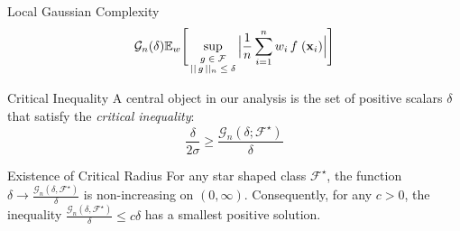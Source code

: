 \documentclass[11pt]{beamer}
\newcommand{\E}{\mathbb{E}}
\newcommand{\bx}{\mathbf{x}}
\newcommand{\cF}{\mathcal{F}}
\newcommand{\cG}{\mathcal{G}}
\begin{document}
	\begin{frame}				
		\begin{block}{Local Gaussian Complexity}
			\begin{equation*}
			\cG_n(\delta)  \E_w\Bigg[\sup_{
				\begin{scriptsize}
				\begin{matrix}
				g\in \cF\\||\,g\,||_n \leq \delta
				\end{matrix}
				\end{scriptsize}}\Big|\frac{1}{n}\sum_{i = 1}^{n}w_i\, f\;(\bx_i)\Big|\Bigg] 
			\end{equation*}
		\end{block}
		
		\begin{block}{Critical Inequality}
			A central object in our analysis is the set of positive scalars $\delta$ that satisfy the \textit{critical inequality}:
			\begin{equation*}
			\frac{\delta}{2\sigma} \geq \frac{\cG_n(\delta; \cF^\star)}{\delta}
			\end{equation*}			
			\vspace{-0.3cm}
		\end{block}										
		\begin{block}{Existence of Critical Radius}
			For any star shaped class $\mathcal{F}^\star$, the function $\delta \rightarrow \frac{\cG_n(\delta, \cF^\star)}{\delta}$ is non-increasing on $(0, \infty)$. Consequently, for any $c>0$, the inequality $\frac{\cG_n(\delta, \cF^\star)}{\delta} \leq c\delta$
			has a smallest positive solution.
		\end{block}			
	\end{frame}
\end{document}
